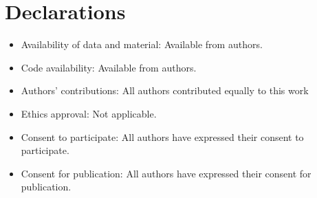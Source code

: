 \documentclass[sn-mathphys]{sn-jnl}%
\theoremstyle{thmstyleone}%
\theoremstyle{thmstyletwo}%
\theoremstyle{thmstylethree}%
\begin{document}
\section*{Declarations}
%

\begin{itemize}
\item Availability of data and material: Available from authors.
\item Code availability: Available from authors.
\item Authors' contributions: All authors contributed equally to this work
\item Ethics approval: Not applicable.
\item Consent to participate: All authors have expressed their consent to participate.
\item Consent for publication: All authors have expressed their consent for publication.
%
\end{itemize}






\end{document}
